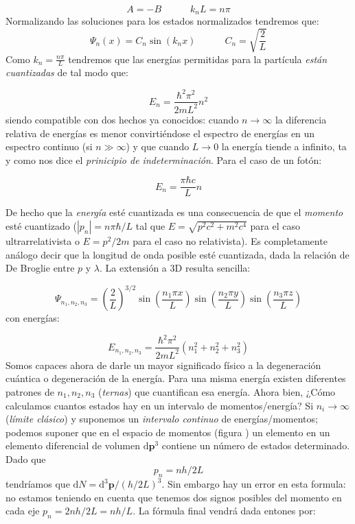 \documentclass[12pt,a4paper]{article}
\numberwithin{equation}{section}
\numberwithin{figure}{section}
\newcommand{\parentesis}[1]{\left( #1  \right)}
\newcommand{\D}{\mathrm{d}}
\newcommand{\tquad}{\quad \quad \quad}
\newcommand{\pn}{\mathbf{p}}
\begin{document}
\begin{equation}
A =  - B \tquad k_n L = n \pi
\end{equation}
Normalizando las soluciones para los estados normalizados tendremos que:
\begin{equation}
\Psi_n (x) = C_n \sin (k_n x) \tquad C_n = \sqrt{\frac{2}{L}}
\end{equation}
Como $k_n = \frac{n \pi}{L}$ tendremos que las energías permitidas para la partícula \textit{están cuantizadas} de tal modo que:

\begin{equation}
E_n = \frac{\hbar^2 \pi^2}{2m L^2} n^2
\end{equation}
siendo compatible con dos hechos ya conocidos: cuando $n \rightarrow \infty$ la diferencia relativa de energías es menor convirtiéndose el espectro de energías en un espectro continuo (si $n \gg \infty$) y que cuando $L\rightarrow 0$ la energía tiende a infinito, ta y como nos dice el \textit{prinicipio de indeterminación}. Para el caso de un fotón:

\begin{equation}
E_n = \frac{\pi \hbar c}{L} n
\end{equation}

De hecho que la \textit{energía} esté cuantizada es una consecuencia de que el \textit{momento} esté cuantizado ($|p_n| = n \pi \hbar /L$ tal que $E = \sqrt{p^2 c^2 + m^2 c^4}$ para el caso ultrarrelativista o $E = p^2 /2m$ para el caso no relativista). Es completamente análogo decir que la longitud de onda posible esté cuantizada, dada la relación de De Broglie entre $p$ y $\lambda$. La extensión a 3D resulta sencilla:

\begin{equation}
\Psi_{n_1,n_2,n_3} = \parentesis{\dfrac{2}{L}}^{3/2} \sin \parentesis{\frac{n_1 \pi x}{L}}\sin \parentesis{\frac{n_2 \pi y}{L}} \sin \parentesis{\frac{n_3 \pi z}{L}}
\end{equation}
con energías:

\begin{equation}
E_{n_1,n_2,n_3} = \frac{\hbar^2 \pi^2}{2m L^2} \parentesis{n_1^2+n_2^2+n_3^2}
\end{equation}
Somos capaces ahora de darle un mayor significado físico a la degeneración cuántica o degeneración de la energía. Para una misma energía existen diferentes patrones de $n_1,n_2,n_3$ (\textit{ternas}) que cuantifican esa energía. Ahora bien, ¿Cómo calculamos cuantos estados hay en un intervalo de momentos/energía? Si $n_i \rightarrow \infty$ (\textit{límite clásico}) y suponemos un \textit{intervalo continuo} de energías/momentos; podemos suponer que en el espacio de momentos (figura ) un elemento en un elemento diferencial de volumen $\D \pn^3$ contiene un número de estados determinado. Dado que $$ p_n = n h / 2 L $$ tendríamos que $ \D N  = \D^3 \pn / ( h/2L)^3 $. Sin embargo hay un error en esta formula: no estamos teniendo en cuenta que tenemos dos signos posibles del momento en cada eje $p_n = 2 n h /2 L = n h /L$. La fórmula final vendrá dada entones por:
\end{document}
